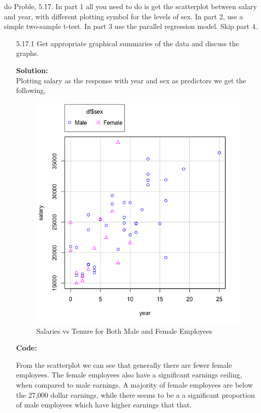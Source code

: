 \documentclass[12pt]{article}
\makeatletter
\theoremstyle{homework}
\newenvironment{exercise}[1]
{\def\@currentlabel{#1}\exercisecore}
{\endexercisecore}
\newcommand{\localhead}[1]{\par\smallskip\noindent\textbf{#1}\nobreak\\}%
\newcommand\solution{\localhead{Solution:}}
\makeatother
\begin{document}
\begin{exercise}{2} do Proble, 5.17. In part 1 all you need to do is get the scatterplot between salary and year, with 
  different plotting symbol for the levels of sex. In part 2, use a simple two-sample t-test. In part 3 use the parallel 
  regression model. Skip part 4.
   \begin{enumerate}
     \item[5.17.1] Get appropriate graphical summaries of the data and discuss the graphs.\\ 
     \solution Plotting salary as the response with year and sex as predictors we get the following, 
     \begin{figure}[H]
      \begin{center}
      \caption{Salaries vs Tenure for Both Male and Female Employees}
      \includegraphics[width = .66\textwidth]{Rplot01.png}
      \end{center}
     \end{figure}    
       \textbf{Code:}
       \begin{center}
       
       \end{center}  
       From the scatterplot we can see that generally there are fewer female employees. The female employees also have a significant 
       earnings ceiling, when compared to male earnings. A majority of female employees are below the 27,000 dollar earnings, while there seems to be a 
       a significant proportion of male employees which have higher earnings that that.\\
       \newpage


\end{enumerate}
\end{exercise}
\end{document}
